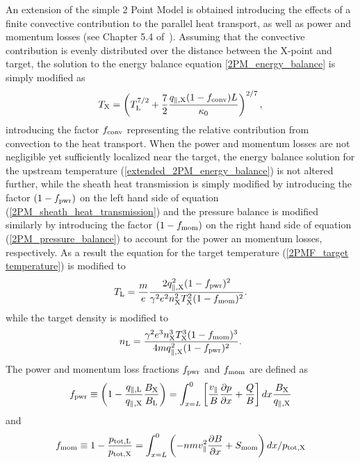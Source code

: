 \documentclass[amsmath,amssymb,a4]{revtex4-2}
\begin{document}
An extension of the simple 2 Point Model is obtained introducing the effects of a finite convective contribution to the parallel heat transport, as well as power and momentum losses (see Chapter 5.4 of~\cite{stangeby}). Assuming that the convective contribution is evenly distributed over the distance between the X-point and target, the solution to the energy balance equation \ref{2PM_energy_balance} is simply modified as
\begin{equation}\label{extended_2PM_energy_balance}
    T_{\rm X} = \left(T_{\rm L}^{7/2} + {7 \over 2} {q_{\parallel,\rm X} (1 - f_{\rm conv}) L \over \kappa_0}\right)^{2/7},
\end{equation}
introducing the factor $f_{\rm conv}$ representing the relative contribution from convection to the heat transport. When the power and momentum losses are not negligible yet sufficiently localized near the target, the energy balance solution for the upstream temperature (\ref{extended_2PM_energy_balance}) is not altered further, while the sheath heat transmission is simply modified by introducing the factor $(1-f_{\rm pwr})$ on the left hand side of equation (\ref{2PM_sheath_heat_transmission}) and the pressure balance is modified similarly by introducing the factor $(1-f_{\rm mom})$ on the right hand side of equation (\ref{2PM_pressure_balance}) to account for the power an momentum losses, respectively. As a result the equation for the target temperature (\ref{2PMF_target temperature}) is modified to
\begin{equation}\label{extended_2PM_target_temperature}
    T_{\rm L} = {m \over e} {2 q_{\parallel,\rm X}^2 (1-f_{\rm pwr})^2 \over \gamma^2 e^2 n_{\rm X}^2 T_{\rm X}^2 (1-f_{\rm mom})^2}.
\end{equation}
while the target density is modified to
\begin{equation}\label{extended_2PM_target_density}
    n_{\rm L} = {\gamma^2 e^3 n_{\rm X}^3 T_{\rm X}^3 (1-f_{\rm mom})^3 \over 4 m q_{\parallel,\rm X}^2 (1-f_{\rm pwr})^2}.
\end{equation}
The power and momentum loss fractions $f_{\rm pwr}$ and $f_{\rm mom}$ are defined as
\begin{equation} \label{power_loss_fraction}
f_{\rm pwr} \equiv \left(1-\frac{q_{\mathrm{\|,L}} }{q_{\mathrm{\|,X}}} \frac{B_{\mathrm{X}}}{B_{\mathrm{L}}}\right)=\int_{x=L}^{0}\left[\frac{v_{\|}}{B} \frac{\partial p}{\partial x}+\frac{Q}{B}\right] d x \frac{B_{\rm X}}{q_{\mathrm{\|,X}}}
\end{equation}
and
\begin{equation}\label{momentum_loss_fraction}
f_{\rm mom} \equiv 1-\frac{p_{\rm tot,L}}{p_{\rm tot,X}}=\int_{x=L}^{0}\left(-n m v_{\|}^{2} \frac{\partial B}{\partial x}+S_{\rm mom}\right) d x / p_{\rm tot,X}
\end{equation}
\end{document}
